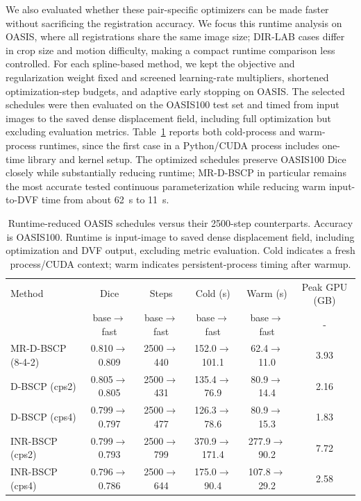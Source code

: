 
We also evaluated whether these pair-specific optimizers can be made faster
without sacrificing the registration accuracy. We focus this runtime analysis on
OASIS, where all registrations share the same image size; DIR-LAB cases differ
in crop size and motion difficulty, making a compact runtime comparison less
controlled. For each spline-based method, we kept the objective and
regularization weight fixed and screened learning-rate multipliers, shortened
optimization-step budgets, and adaptive early stopping on OASIS. The selected
schedules were then evaluated on the OASIS100 test set and timed from input
images to the saved dense displacement field, including full optimization but
excluding evaluation metrics. Table~\ref{tab:oasis_runtime} reports both
cold-process and warm-process runtimes, since the first case in a Python/CUDA
process includes one-time library and kernel setup. The optimized schedules
preserve OASIS100 Dice closely while substantially reducing runtime; MR-D-BSCP
in particular remains the most accurate tested continuous parameterization
while reducing warm input-to-DVF time from about 62~s to 11~s.

\begin{table}[t]
\centering
\caption{Runtime-reduced OASIS schedules versus their 2500-step counterparts.
Accuracy is OASIS100. Runtime is input-image to saved dense displacement field,
including optimization and DVF output, excluding metric evaluation.
Cold indicates a fresh process/CUDA context; warm indicates persistent-process
timing after warmup.}
\label{tab:oasis_runtime}
\fontsize{8}{9}\selectfont
\setlength{\tabcolsep}{2.5pt}
\begin{tabular}{@{}lccccc@{}}
\hline
Method & Dice & Steps & Cold (s) & Warm (s) & Peak GPU (GB) \\
 & base$\rightarrow$fast & base$\rightarrow$fast & base$\rightarrow$fast & base$\rightarrow$fast & - \\
\hline
MR-D-BSCP (8-4-2) &
0.810$\rightarrow$0.809 & 2500$\rightarrow$440 &
152.0$\rightarrow$101.1 & 62.4$\rightarrow$11.0 & 3.93 \\
D-BSCP (cps2) &
0.805$\rightarrow$0.805 & 2500$\rightarrow$431 &
135.4$\rightarrow$76.9 & 80.9$\rightarrow$14.4 & 2.16 \\
D-BSCP (cps4) &
0.799$\rightarrow$0.797 & 2500$\rightarrow$477 &
126.3$\rightarrow$78.6 & 80.9$\rightarrow$15.3 & 1.83 \\
INR-BSCP (cps2) &
0.799$\rightarrow$0.793 & 2500$\rightarrow$799 &
370.9$\rightarrow$171.4 & 277.9$\rightarrow$90.2 & 7.72 \\
INR-BSCP (cps4) &
0.796$\rightarrow$0.786 & 2500$\rightarrow$644 &
175.0$\rightarrow$90.4 & 107.8$\rightarrow$29.2 & 2.58 \\
\hline
\end{tabular}
\end{table}

